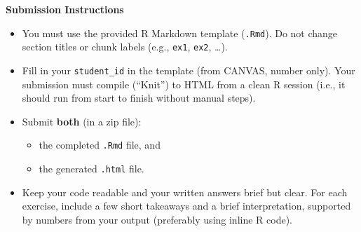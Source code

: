 \documentclass[12pt]{article}
\begin{document}
\begin{center}
    \textbf{Submission Instructions}    
\end{center}

\begin{itemize}
    \item You must use the provided R Markdown template (\texttt{.Rmd}). Do not change section titles or chunk labels (e.g., \texttt{ex1}, \texttt{ex2}, \dots).
    \item Fill in your \texttt{student\_id} in the template (from CANVAS, number only). Your submission must compile (“Knit”) to HTML from a clean R session (i.e., it should run from start to finish without manual steps).
    \item Submit \textbf{both} (in a zip file):
    \begin{itemize}
        \item the completed \texttt{.Rmd} file, and
        \item the generated \texttt{.html} file.
    \end{itemize}
    \item Keep your code readable and your written answers brief but clear. For each exercise, include a few short takeaways and a brief interpretation, supported by numbers from your output (preferably using inline R code).
\end{itemize}
\end{document}
